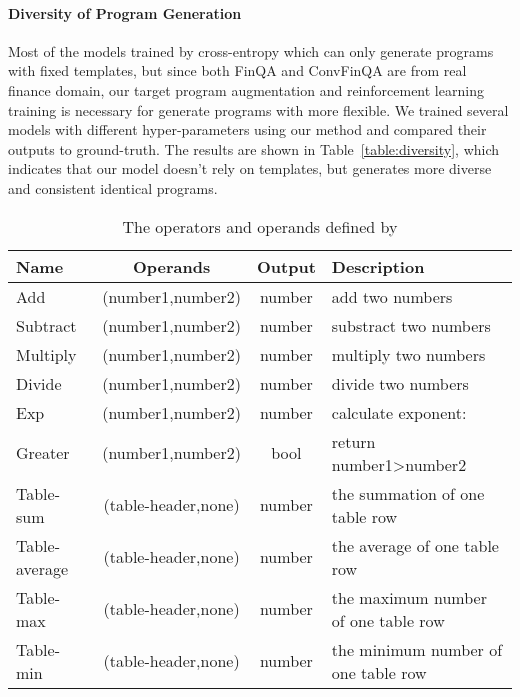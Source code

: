 \documentclass[11pt]{article}
\begin{document}
\paragraph{Diversity of Program Generation}
\label{appendix:diversity}
Most of the models trained by cross-entropy which can only generate programs with fixed templates, but since both FinQA and ConvFinQA are from real finance domain, our target program augmentation and reinforcement learning training is necessary for generate programs with more flexible. We trained several models with different hyper-parameters using our method and compared their outputs to ground-truth. The results are shown in Table~\ref{table:diversity}, which indicates that our model doesn't rely on templates, but generates more diverse and consistent identical programs.


\begin{table*}[t]
\centering
\begin{tabular}{l|c|c|l}
\hline
Name          & Operands                      & Output & Description                         \\ \hline
Add           & (number1,number2)             & number & add two numbers                     \\
Subtract      & (number1,number2)             & number & substract two numbers               \\
Multiply      & (number1,number2)             & number & multiply two numbers                \\
Divide        & (number1,number2)             & number & divide two numbers                  \\
Exp           & (number1,number2)             & number & calculate exponent:                 \\
Greater       & (number1,number2)             & bool   & return number1\textgreater{}number2 \\
Table-sum     & (table-header,none)           & number & the summation of one table row      \\
Table-average & (table-header,none)           & number & the average of one table row        \\
Table-max     & (table-header,none)           & number & the maximum number of one table row \\
Table-min     & (table-header,none)           & number & the minimum number of one table row \\ \hline
\end{tabular}
\caption{The operators and operands defined by \cite{chen2021finqa}}
\label{table:operator}
\end{table*}
\end{document}
